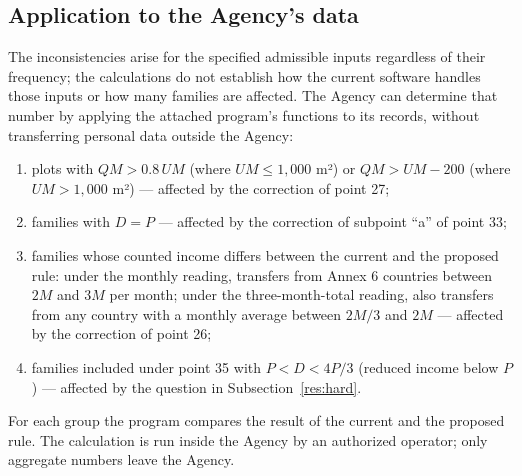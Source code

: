 \documentclass[14pt,a4paper]{extarticle}
\begin{document}
\subsection{Application to the Agency’s data}\label{sec:agency}
The inconsistencies arise for the specified admissible inputs regardless of their frequency; the calculations do not establish how the current software handles those inputs or how many families are affected. The Agency can determine that number by applying the attached program’s functions to its records, without transferring personal data outside the Agency:
\begin{enumerate}[leftmargin=1.27cm]
\item plots with $QM>0.8\,UM$ (where $UM\le1{,}000$ m²) or $QM>UM-200$ (where $UM>1{,}000$ m²) — affected by the correction of point 27;
\item families with $D=P$ — affected by the correction of subpoint “a” of point 33;
\item families whose counted income differs between the current and the proposed rule: under the monthly reading, transfers from Annex 6 countries between $2M$ and $3M$ per month; under the three-month-total reading, also transfers from any country with a monthly average between $2M/3$ and $2M$ — affected by the correction of point 26;
\item families included under point 35 with $P<D<4P/3$ (reduced income below $P$) — affected by the question in Subsection~\ref{res:hard}.
\end{enumerate}
For each group the program compares the result of the current and the proposed rule. The calculation is run inside the Agency by an authorized operator; only aggregate numbers leave the Agency.
\end{document}
